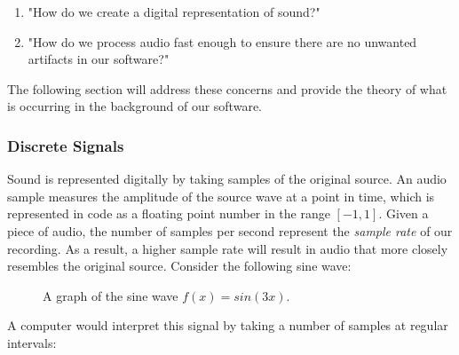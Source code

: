\documentclass[12pt]{article}
\begin{document}
\begin{enumerate}
	\item "How do we create a digital representation of sound?"
	\item "How do we process audio fast enough to ensure there are no unwanted artifacts in our software?"
\end{enumerate}

The following section will address these concerns and provide the theory of what is occurring in the background of our software.

\subsubsection{Discrete Signals}
Sound is represented digitally by taking samples of the original source. An audio sample measures the amplitude of the source wave at a point in time, which is represented in code as a floating point number in the range \([-1, 1]\). Given a piece of audio, the number of samples per second represent the \textit{sample rate} of our recording. As a result, a higher sample rate will result in audio that more closely resembles the original source. Consider the following sine wave:

\begin{figure}[h] %
\begin{center}
	\caption{A graph of the sine wave \(f(x) = sin(3x)\).}
\end{center}
\end{figure}

\newpage

A computer would interpret this signal by taking a number of samples at regular intervals:
\end{document}
